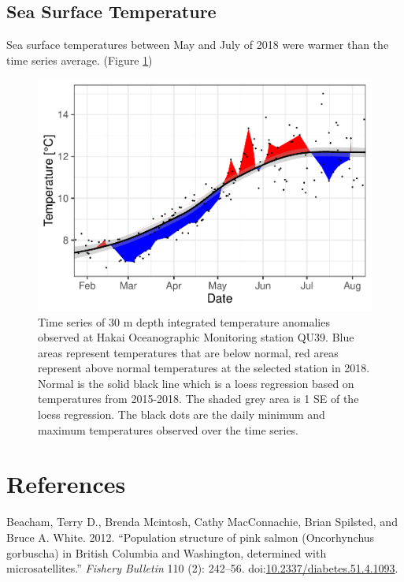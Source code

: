 \documentclass[fleqn,10pt]{wlpeerj} %
\begin{document}
\subsection*{Sea Surface Temperature}\label{sea-surface-temperature}

Sea surface temperatures between May and July of 2018 were warmer than
the time series average. (Figure \ref{fig:sst})

\begin{figure}[H]
\includegraphics[width=0.8\linewidth]{peer_j_migration_dynamics_files/figure-latex/sst-1} \caption{Time series of 30 m depth integrated temperature anomalies observed at Hakai Oceanographic Monitoring station QU39. Blue areas represent temperatures that are below normal, red areas represent above normal temperatures at the selected station in 2018. Normal is the solid black line which is a loess regression based on temperatures from 2015-2018. The shaded grey area is 1 SE of the loess regression. The black dots are the daily minimum and maximum temperatures observed over the time series.}\label{fig:sst}
\end{figure}

\section*{References}\label{references}

\hypertarget{refs}{}
\hypertarget{ref-Beacham2012}{}
Beacham, Terry D., Brenda Mcintosh, Cathy MacConnachie, Brian Spilsted,
and Bruce A. White. 2012. ``Population structure of pink salmon
(Oncorhynchus gorbuscha) in British Columbia and Washington, determined
with microsatellites.'' \emph{Fishery Bulletin} 110 (2): 242--56.
doi:\href{https://doi.org/10.2337/diabetes.51.4.1093}{10.2337/diabetes.51.4.1093}.
\end{document}
